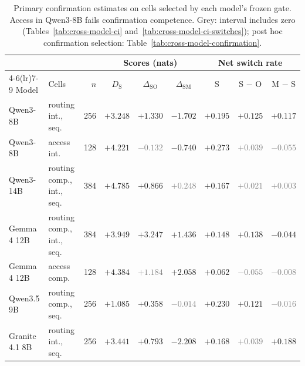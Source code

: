 \begin{table}[t]
\centering
\small
\setlength{\tabcolsep}{4pt}
\begin{tabular}{@{}llrcccccc@{}}
\toprule
 & & & \multicolumn{3}{c}{Scores (nats)} & \multicolumn{3}{c}{Net switch rate} \\
\cmidrule(lr){4-6}\cmidrule(lr){7-9}
Model & Cells & $n$ & $D_{\mathrm{S}}$ & $\Delta_{\mathrm{SO}}$ & $\Delta_{\mathrm{SM}}$ & S & S $-$ O & M $-$ S \\
\midrule
Qwen3-8B & routing int., seq. & 256 & $+3.248$ & $+1.330$ & $-1.702$ & $+0.195$ & $+0.125$ & $+0.117$ \\
Qwen3-8B & access int. & 128 & $+4.221$ & \textcolor{gray}{$-0.132$} & $-0.740$ & $+0.273$ & \textcolor{gray}{$+0.039$} & \textcolor{gray}{$-0.055$} \\
Qwen3-14B & routing comp., int., seq. & 384 & $+4.785$ & $+0.866$ & \textcolor{gray}{$+0.248$} & $+0.167$ & \textcolor{gray}{$+0.021$} & \textcolor{gray}{$+0.003$} \\
Gemma 4 12B & routing comp., int., seq. & 384 & $+3.949$ & $+3.247$ & $+1.436$ & $+0.148$ & $+0.138$ & $-0.044$ \\
Gemma 4 12B & access comp. & 128 & $+4.384$ & \textcolor{gray}{$+1.184$} & $+2.058$ & $+0.062$ & \textcolor{gray}{$-0.055$} & \textcolor{gray}{$-0.008$} \\
Qwen3.5 9B & routing comp., seq. & 256 & $+1.085$ & $+0.358$ & \textcolor{gray}{$-0.014$} & $+0.230$ & $+0.121$ & \textcolor{gray}{$-0.016$} \\
Granite 4.1 8B & routing int., seq. & 256 & $+3.441$ & $+0.793$ & $-2.208$ & $+0.168$ & \textcolor{gray}{$+0.039$} & $+0.188$ \\
\bottomrule
\end{tabular}
\caption{Primary confirmation estimates on cells selected by each model\textquoteright s frozen gate. Access in Qwen3-8B fails confirmation competence. Grey: interval includes zero (Tables~\ref{tab:cross-model-ci} and~\ref{tab:cross-model-ci-switches}); post hoc confirmation selection: Table~\ref{tab:cross-model-confirmation}.}
\label{tab:cross-model}
\end{table}
